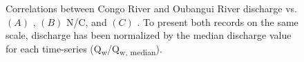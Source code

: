 \begin{figure}[p]
	\caption[Discharge vs. , N/C, and ]{Correlations between Congo River and Oubangui River discharge vs. $(A)$ , $(B)$ N/C, and $(C)$ . To present both records on the same scale, discharge has been normalized by the median discharge value for each time-series (Q\textsubscript{w}/Q\textsubscript{w, median}).}
	\label{Ch5Fig:6} 
\end{figure}

